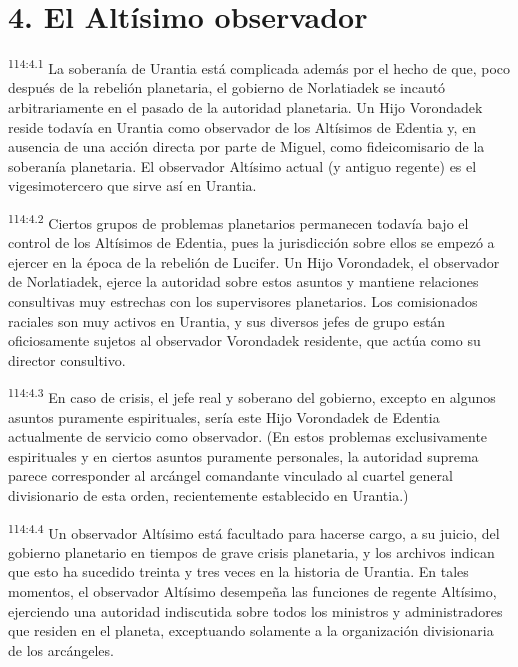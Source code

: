 \section*{4. El Altísimo observador}
\par
\textsuperscript{114:4.1} La soberanía de Urantia está complicada además por el hecho de que, poco después de la rebelión planetaria, el gobierno de Norlatiadek se incautó arbitrariamente en el pasado de la autoridad planetaria. Un Hijo Vorondadek reside todavía en Urantia como observador de los Altísimos de Edentia y, en ausencia de una acción directa por parte de Miguel, como fideicomisario de la soberanía planetaria. El observador Altísimo actual (y antiguo regente) es el vigesimotercero que sirve así en Urantia.

\par
\textsuperscript{114:4.2} Ciertos grupos de problemas planetarios permanecen todavía bajo el control de los Altísimos de Edentia, pues la jurisdicción sobre ellos se empezó a ejercer en la época de la rebelión de Lucifer. Un Hijo Vorondadek, el observador de Norlatiadek, ejerce la autoridad sobre estos asuntos y mantiene relaciones consultivas muy estrechas con los supervisores planetarios. Los comisionados raciales son muy activos en Urantia, y sus diversos jefes de grupo están oficiosamente sujetos al observador Vorondadek residente, que actúa como su director consultivo.

\par
\textsuperscript{114:4.3} En caso de crisis, el jefe real y soberano del gobierno, excepto en algunos asuntos puramente espirituales, sería este Hijo Vorondadek de Edentia actualmente de servicio como observador. (En estos problemas exclusivamente espirituales y en ciertos asuntos puramente personales, la autoridad suprema parece corresponder al arcángel comandante vinculado al cuartel general divisionario de esta orden, recientemente establecido en Urantia.)

\par
\textsuperscript{114:4.4} Un observador Altísimo está facultado para hacerse cargo, a su juicio, del gobierno planetario en tiempos de grave crisis planetaria, y los archivos indican que esto ha sucedido treinta y tres veces en la historia de Urantia. En tales momentos, el observador Altísimo desempeña las funciones de regente Altísimo, ejerciendo una autoridad indiscutida sobre todos los ministros y administradores que residen en el planeta, exceptuando solamente a la organización divisionaria de los arcángeles.

